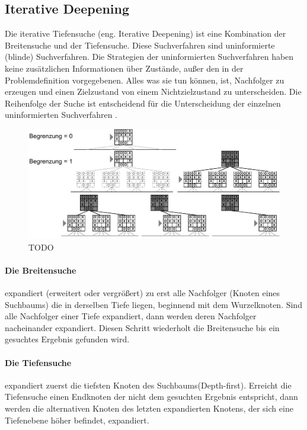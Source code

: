 \subsection{Iterative Deepening}
Die iterative Tiefensuche (eng. Iterative Deepening) ist eine Kombination der Breitensuche und der Tiefensuche. Diese Suchverfahren sind uninformierte (blinde) Suchverfahren. Die Strategien der uninformierten Suchverfahren haben keine zusätzlichen Informationen über Zustände, außer den in der Problemdefinition vorgegebenen. Alles was sie tun können, ist, Nachfolger zu erzeugen und einen Zielzustand von einem Nichtzielzustand zu unterscheiden. Die Reihenfolge der Suche ist entscheidend für die Unterscheidung der einzelnen uninformierten Suchverfahren \cite[116]{Russell}. \\
 
\begin{figure}[!htbp]
  \centering
  \includegraphics[scale = 0.9]{inhalt/abbildungen/iterative_deepening_tictactoe.pdf}
  \caption{TODO }
  \label{fig:minimax_tictactoe}
\end{figure}  
 
\paragraph{Die Breitensuche} expandiert (erweitert oder vergrößert) zu erst alle Nachfolger (Knoten eines Suchbaums) die in derselben Tiefe liegen, beginnend mit dem Wurzelknoten. Sind alle Nachfolger einer Tiefe expandiert, dann werden deren Nachfolger nacheinander expandiert. Diesen Schritt wiederholt die Breitensuche bis ein gesuchtes Ergebnis gefunden wird. \\

\paragraph{Die Tiefensuche} expandiert zuerst die tiefsten Knoten des Suchbaums(Depth-first). Erreicht die Tiefensuche einen Endknoten der nicht dem gesuchten Ergebnis entspricht, dann werden die alternativen Knoten des letzten expandierten Knotens, der sich eine Tiefenebene höher befindet, expandiert. \\

